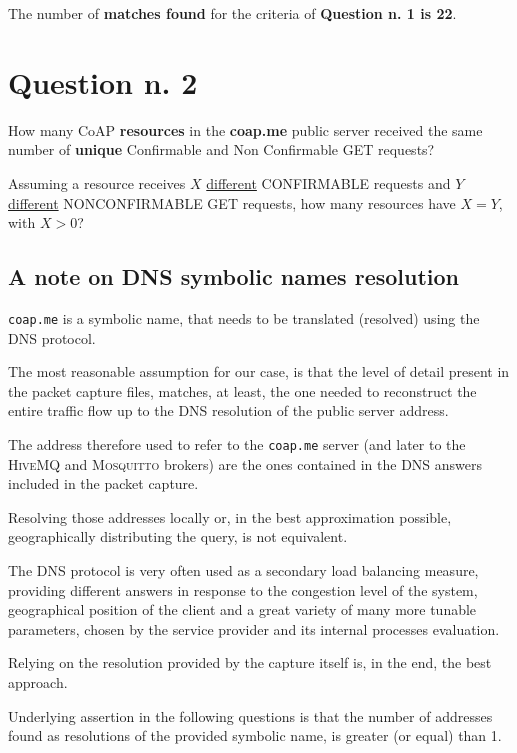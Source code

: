 \documentclass[a4paper,11pt]{article} %
\begin{document}
    The number of \textbf{matches found} for the criteria of \textbf{Question n. 1 is 22}.


    \section{Question n. 2}\label{sec:question-n.-2}
    How many CoAP \textbf{resources} in the \textbf{coap.me} public server received the same number of \textbf{unique} Confirmable and Non Confirmable GET requests?

    Assuming a resource receives \textbf{$X$} \underline{different} CONFIRMABLE requests and \textbf{$Y$} \underline{different} NONCONFIRMABLE GET requests, how many resources have $X = Y$, with $X > 0$?

    \subsection{A note on DNS symbolic names resolution}\label{subsec:a-note-on-dns-symbolic-names-resolution}

    \texttt{coap.me} is a symbolic name, that needs to be translated (resolved) using the \textsc{DNS} protocol.

    The most reasonable assumption for our case, is that the level of detail present in the packet capture files, matches, at least, the one needed to reconstruct the entire traffic flow up to the \textsc{DNS} resolution of the public server address.

    The address therefore used to refer to the \texttt{coap.me} server (and later to the \textsc{HiveMQ} and \textsc{Mosquitto} brokers) are the ones contained in the \textsc{DNS} answers included in the packet capture.

    Resolving those addresses locally or, in the best approximation possible, geographically distributing the query, is not equivalent.

    The \textsc{DNS} protocol is very often used as a secondary load balancing measure, providing different answers in response to the congestion level of the system, geographical position of the client and a great variety of many more tunable parameters, chosen by the service provider and its internal processes evaluation.

    Relying on the resolution provided by the capture itself is, in the end, the best approach.

    Underlying assertion in the following questions is that the number of addresses found as resolutions of the provided symbolic name, is greater (or equal) than 1.
\end{document}

